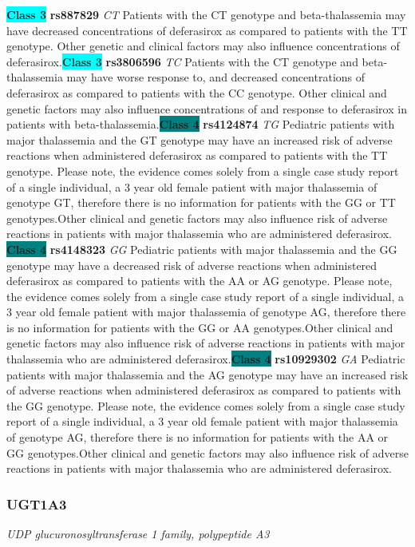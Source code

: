 \documentclass{report}
\begin{document}
\textbf{\colorbox{cyan} {Class 3}} \textbf{ rs887829 } \textit{ CT }
Patients with the CT genotype and beta-thalassemia may have decreased concentrations of deferasirox as compared to patients with the TT genotype. Other genetic and clinical factors may also influence concentrations of deferasirox.\newline\textbf{\colorbox{cyan} {Class 3}} \textbf{ rs3806596 } \textit{ TC }
Patients with the CT genotype and beta-thalassemia may have worse response to, and decreased concentrations of deferasirox as compared to patients with the CC genotype. Other clinical and genetic factors may also influence concentrations of and response to deferasirox in patients with beta-thalassemia.\newline\textbf{\colorbox{teal} {Class 4}} \textbf{ rs4124874 } \textit{ TG }
Pediatric patients with major thalassemia and the GT genotype may have an increased risk of adverse reactions when administered deferasirox as compared to patients with the TT genotype. Please note, the evidence comes solely from a single case study report of a single individual, a 3 year old female patient with major thalassemia of genotype GT, therefore there is no information for patients with the GG or TT genotypes.Other clinical and genetic factors may also influence risk of adverse reactions in patients with major thalassemia who are administered deferasirox. \newline\textbf{\colorbox{teal} {Class 4}} \textbf{ rs4148323 } \textit{ GG }
Pediatric patients with major thalassemia and the GG genotype may have a decreased risk of adverse reactions when administered deferasirox as compared to patients with the AA or AG genotype. Please note, the evidence comes solely from a single case study report of a single individual, a 3 year old female patient with major thalassemia of genotype AG, therefore there is no information for patients with the GG or AA genotypes.Other clinical and genetic factors may also influence risk of adverse reactions in patients with major thalassemia who are administered deferasirox.\newline\textbf{\colorbox{teal} {Class 4}} \textbf{ rs10929302 } \textit{ GA }
Pediatric patients with major thalassemia and the AG genotype may have an increased risk of adverse reactions when administered deferasirox as compared to patients with the GG genotype. Please note, the evidence comes solely from a single case study report of a single individual, a 3 year old female patient with major thalassemia of genotype AG, therefore there is no information for patients with the AA or GG genotypes.Other clinical and genetic factors may also influence risk of adverse reactions in patients with major thalassemia who are administered deferasirox.\newline\subsubsection{ UGT1A3 }
\textit{ UDP glucuronosyltransferase 1 family, polypeptide A3 }
\end{document}
